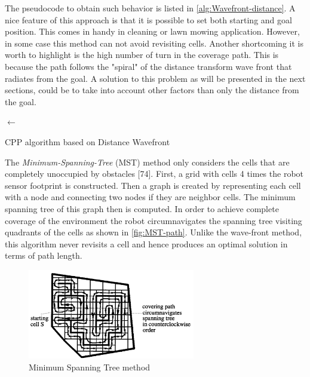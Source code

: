 The pseudocode to obtain such behavior is listed in \autoref{alg:Wavefront-distance}.
A nice feature of this approach is that it is possible to set both starting and goal position. This comes in handy in cleaning or lawn mowing application. However, in some case this method can not avoid revisiting cells. Another shortcoming it is worth to highlight is the high number of turn in the coverage path. This is because the path follows the "spiral" of the distance transform wave front that radiates from the goal. A solution to this problem as will be presented in the next sections, could be to take into account other factors than only the distance from the goal.\par
\begin{algorithm}

	\BlankLine
	\SCell $\leftarrow$ \CCell \;
\caption{CPP algorithm based on Distance Wavefront}
\label{alg:Wavefront-distance}
\end{algorithm}
The \textit{Minimum-Spanning-Tree} (MST) method only considers the cells that are completely unoccupied by obstacles [74]. First, a grid with cells 4 times the robot sensor footprint is constructed. Then a graph is created by representing each cell with a node and connecting two nodes if they are neighbor cells. The minimum spanning tree of this graph then is computed. In order to achieve complete coverage of the environment the robot circumnavigates the spanning tree visiting quadrants of the cells as shown in \autoref{fig:MST-path}. Unlike the wave-front method, this algorithm never revisits a cell and hence produces an optimal solution in terms of path length. 
\begin{figure}[ht]
    \centering
    \includegraphics[width=0.65\textwidth]{figures/C3/MST-path.png}
    \caption{Minimum Spanning Tree method}
    \label{fig:MST-path}
\end{figure}


